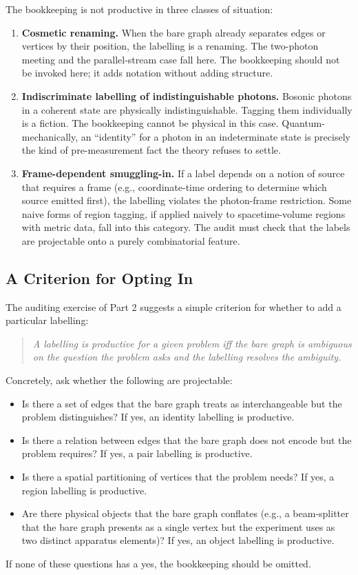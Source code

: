 \documentclass[11pt]{article}
\begin{document}
The bookkeeping is not productive in three classes of situation:
\begin{enumerate}
    \item \textbf{Cosmetic renaming.} When the bare graph already separates edges or vertices by their position, the labelling is a renaming. The two-photon meeting and the parallel-stream case fall here. The bookkeeping should not be invoked here; it adds notation without adding structure.
    \item \textbf{Indiscriminate labelling of indistinguishable photons.} Bosonic photons in a coherent state are physically indistinguishable. Tagging them individually is a fiction. The bookkeeping cannot be physical in this case. Quantum-mechanically, an ``identity'' for a photon in an indeterminate state is precisely the kind of pre-measurement fact the theory refuses to settle.
    \item \textbf{Frame-dependent smuggling-in.} If a label depends on a notion of source that requires a frame (e.g., coordinate-time ordering to determine which source emitted first), the labelling violates the photon-frame restriction. Some naive forms of region tagging, if applied naively to spacetime-volume regions with metric data, fall into this category. The audit must check that the labels are projectable onto a purely combinatorial feature.
\end{enumerate}

\subsection{A Criterion for Opting In}

The auditing exercise of Part 2 suggests a simple criterion for whether to add a particular labelling:
\begin{quote}
\emph{A labelling is productive for a given problem iff the bare graph is ambiguous on the question the problem asks and the labelling resolves the ambiguity.}
\end{quote}
Concretely, ask whether the following are projectable:
\begin{itemize}
    \item Is there a set of edges that the bare graph treats as interchangeable but the problem distinguishes? If yes, an identity labelling is productive.
    \item Is there a relation between edges that the bare graph does not encode but the problem requires? If yes, a pair labelling is productive.
    \item Is there a spatial partitioning of vertices that the problem needs? If yes, a region labelling is productive.
    \item Are there physical objects that the bare graph conflates (e.g., a beam-splitter that the bare graph presents as a single vertex but the experiment uses as two distinct apparatus elements)? If yes, an object labelling is productive.
\end{itemize}
If none of these questions has a yes, the bookkeeping should be omitted.
\end{document}
